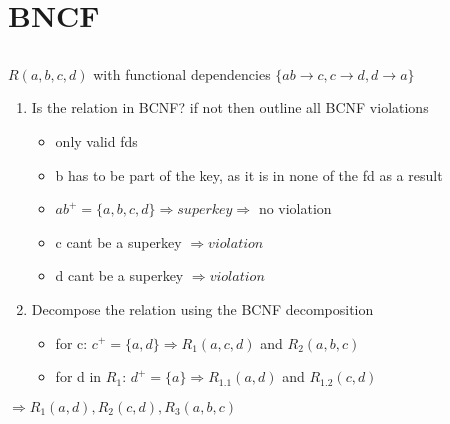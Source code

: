 \documentclass{article}
\begin{document}
\section{BNCF}
\subsection*{} $R(a, b, c, d)$ with functional dependencies
    $\{ab \rightarrow c, c \rightarrow d, d \rightarrow a\}$
\begin{enumerate}
    \item Is the relation in BCNF? if not then outline all BCNF violations 
        \begin{itemize}
            \item only valid fds
            \item b has to be part of the key, as it is in none of the fd as a result
            \item $ab^{+} = \{a, b, c, d\} \Rightarrow superkey \Rightarrow$ no violation
            \item c cant be a superkey $\Rightarrow violation$
            \item d cant be a superkey $\Rightarrow violation$
        \end{itemize} 
    \item Decompose the relation using the BCNF decomposition
        \begin{itemize}
            \item for c: $c^{+} = \{a, d\} \Rightarrow R_{1}(a, c, d)$ and $R_{2}(a, b, c)$
            \item for d in $R_{1}$: $d^{+} = \{a\} \Rightarrow R_{1.1}(a, d)$ and $R_{1.2}(c, d)$
        \end{itemize}
\end{enumerate}
$\Rightarrow R_{1}(a, d), R_{2}(c, d), R_{3}(a, b, c)$
\end{document}
